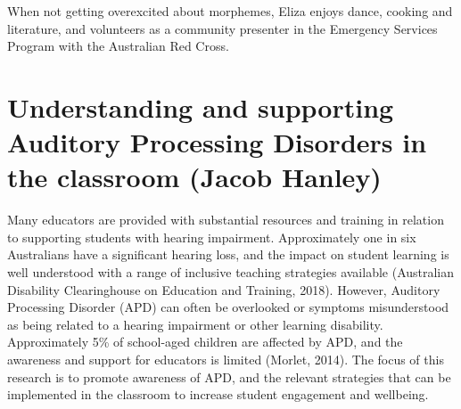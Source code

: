 \documentclass[twoside,14pt,a4paper,notitlepage]{memoir}
\begin{document}
When not getting overexcited about morphemes, Eliza enjoys dance, cooking and literature, and volunteers as a community presenter in the Emergency Services Program with the Australian Red Cross.



\section*{Understanding and supporting Auditory Processing Disorders in the classroom (Jacob Hanley)}
\label{aut:hanley}

Many educators are provided with substantial resources and training in relation to supporting students with hearing impairment. Approximately one in six Australians have a significant hearing loss, and the impact on student learning is well understood with a range of inclusive teaching strategies available (Australian Disability Clearinghouse on Education and Training, 2018). However, Auditory Processing Disorder (APD) can often be overlooked or symptoms misunderstood as being related to a hearing impairment or other learning disability. Approximately 5\% of school-aged children are affected by APD, and the awareness and support for educators is limited (Morlet, 2014). The focus of this research is to promote awareness of APD, and the relevant strategies that can be implemented in the classroom to increase student engagement and wellbeing.
\end{document}
